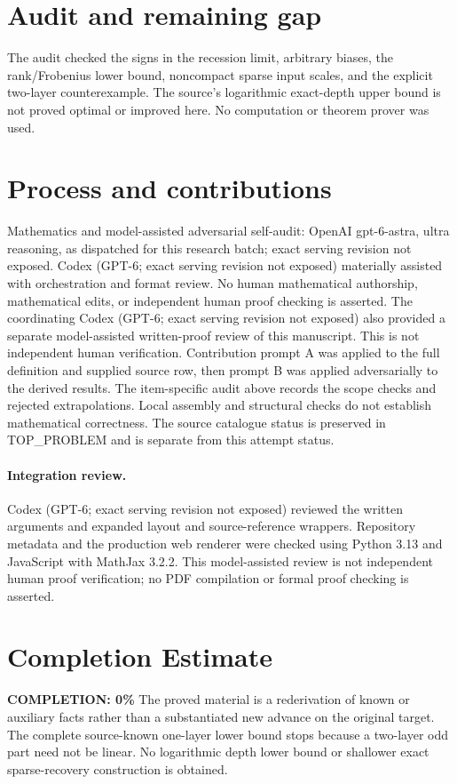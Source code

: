 \documentclass[11pt]{article}
\begin{document}
\section{Audit and remaining gap}
The audit checked the signs in the recession limit, arbitrary
biases, the rank/Frobenius lower bound, noncompact sparse input
scales, and the explicit two-layer counterexample. The source's
logarithmic exact-depth upper bound is not proved optimal or
improved here. No computation or theorem prover was used.

\section{Process and contributions}
Mathematics and model-assisted adversarial self-audit: OpenAI gpt-6-astra, ultra reasoning, as dispatched for this research batch; exact serving revision not exposed. Codex (GPT-6; exact serving revision not exposed) materially assisted with orchestration and format review. No human mathematical authorship, mathematical edits, or independent human proof checking is asserted.
The coordinating Codex (GPT-6; exact serving revision not exposed) also provided a separate model-assisted written-proof review of this manuscript. This is not independent human verification.
Contribution prompt A was applied to the full definition and supplied source row, then prompt B was applied adversarially to the derived results. The item-specific audit above records the scope checks and rejected extrapolations. Local assembly and structural checks do not establish mathematical correctness. The source catalogue status is preserved in TOP\_PROBLEM and is separate from this attempt status.
\paragraph{Integration review.} Codex (GPT-6; exact serving revision not exposed) reviewed the written arguments and expanded layout and source-reference wrappers. Repository metadata and the production web renderer were checked using Python 3.13 and JavaScript with MathJax 3.2.2. This model-assisted review is not independent human proof verification; no PDF compilation or formal proof checking is asserted.

\section{Completion Estimate}
\noindent\textbf{COMPLETION: 0\%}
The proved material is a rederivation of known or auxiliary facts rather than a substantiated new advance on the original target. The complete source-known one-layer lower bound stops because a two-layer odd part need not be linear. No logarithmic depth lower bound or shallower exact sparse-recovery construction is obtained.
\end{document}
